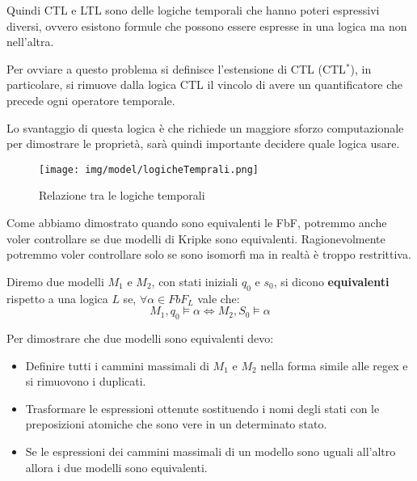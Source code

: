 Quindi CTL e LTL sono delle logiche temporali che hanno poteri espressivi diversi,
ovvero esistono formule che possono essere espresse in una logica ma non nell'altra.

Per ovviare a questo problema si definisce l'estensione di CTL (CTL$^\ast$),
in particolare, si rimuove dalla logica CTL il vincolo di avere un quantificatore
che precede ogni operatore temporale.

Lo svantaggio di questa logica è che richiede un maggiore sforzo computazionale
per dimostrare le proprietà, sarà quindi importante decidere quale logica usare.
\begin{figure}[!ht]
    \centering
    \texttt{[image: img/model/logicheTemprali.png]}
    \caption{Relazione tra le logiche temporali}
\end{figure}
Come abbiamo dimostrato quando sono equivalenti le FbF, potremmo anche voler
controllare se due modelli di Kripke sono equivalenti. Ragionevolmente potremmo
voler controllare solo se sono isomorfi ma in realtà è troppo restrittiva.
\begin{definizione}
    Diremo due modelli $M_1$ e $M_2$, con stati iniziali $q_0$ e $s_0$, si dicono
    \textbf{equivalenti} rispetto a una logica $L$ se, $\forall \alpha \in FbF_L$
    vale che:
    \begin{equation}
        M_1, q_0 \models \alpha \iff M_2, S_0 \models \alpha
    \end{equation}
\end{definizione}
Per dimostrare che due modelli sono equivalenti devo:
\begin{itemize}
    \item Definire tutti i cammini massimali di $M_1$ e $M_2$ nella forma simile
          alle regex e si rimuovono i duplicati.
    \item Trasformare le espressioni ottenute sostituendo i nomi degli stati con
          le preposizioni atomiche che sono vere in un determinato stato.
    \item Se le espressioni dei cammini massimali di un modello sono uguali
          all'altro allora i due modelli sono equivalenti.
\end{itemize}
